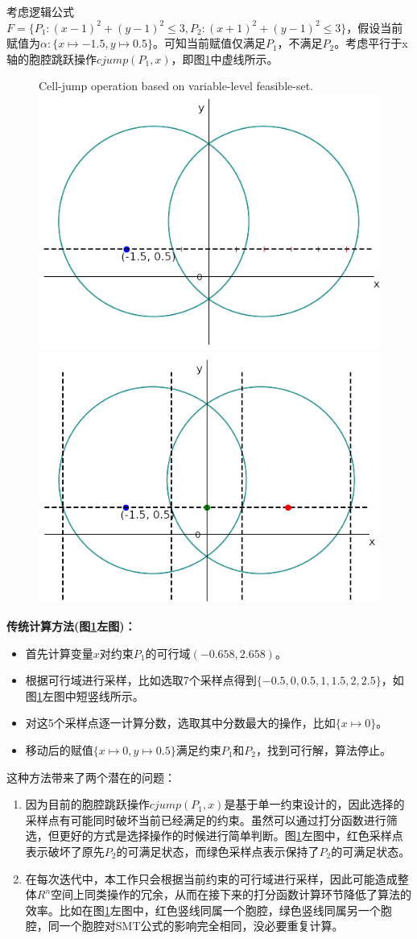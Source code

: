 \begin{example}
\label{ex:jump}
考虑逻辑公式$F = \{P_1: (x-1)^2 + (y-1)^2 \leq 3, P_2: (x+1)^2 + (y-1)^2 \leq 3\}$，假设当前赋值为$\alpha: \{x \mapsto -1.5, y \mapsto 0.5\}$。可知当前赋值仅满足$P_1$，不满足$P_2$。考虑平行于x轴的胞腔跳跃操作$cjump(P_1, x)$，即图\ref{fig:jump2}中虚线所示。

\begin{figure}[t]
    \centering
     {Cell-jump operation based on variable-level feasible-set.}
    \includegraphics[width=0.45\columnwidth]{Img/op1.png}\qquad
    \includegraphics[width=0.45\columnwidth]{Img/op2.png}
\label{fig:jump2}
\end{figure}

\textbf{传统计算方法(图\ref{fig:jump2}左图)：}
\begin{itemize}
    \item 首先计算变量$x$对约束$P_1$的可行域$(-0.658, 2.658)$。
    \item 根据可行域进行采样，比如选取7个采样点得到$\{-0.5, 0, 0.5, 1, 1.5, 2, 2.5\}$，如图\ref{fig:jump2}左图中短竖线所示。
    \item 对这5个采样点逐一计算分数，选取其中分数最大的操作，比如$\{x \mapsto 0\}$。
    \item 移动后的赋值$\{x \mapsto 0, y \mapsto 0.5\}$满足约束$P_1$和$P_2$，找到可行解，算法停止。
\end{itemize}

这种方法带来了两个潜在的问题：
\begin{enumerate}
    \item 因为目前的胞腔跳跃操作$cjump(P_1, x)$是基于单一约束设计的，因此选择的采样点有可能同时破坏当前已经满足的约束。虽然可以通过打分函数进行筛选，但更好的方式是选择操作的时候进行简单判断。图\ref{fig:jump2}左图中，红色采样点表示破坏了原先$P_2$的可满足状态，而绿色采样点表示保持了$P_2$的可满足状态。
    \item 在每次迭代中，本工作只会根据当前约束的可行域进行采样，因此可能造成整体$R^n$空间上同类操作的冗余，从而在接下来的打分函数计算环节降低了算法的效率。比如在图\ref{fig:jump2}左图中，红色竖线同属一个胞腔，绿色竖线同属另一个胞腔，同一个胞腔对SMT公式的影响完全相同，没必要重复计算。
\end{enumerate}


\end{example}
